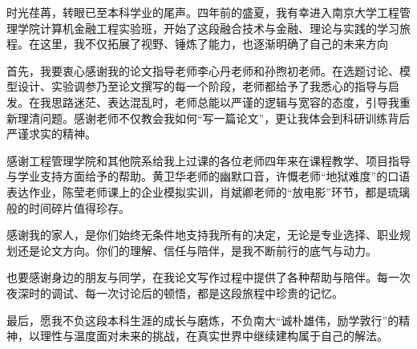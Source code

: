 \documentclass[
    type = bachelor, %
    decl-page,  %
    oneside,                %
  ]{njuthesis}
\begin{document}
%   
%   









\printbibliography


\begin{acknowledgement}
  
  
时光荏苒，转眼已至本科学业的尾声。四年前的盛夏，我有幸进入南京大学工程管理学院计算机金融工程实验班，开始了这段融合技术与金融、理论与实践的学习旅程。在这里，我不仅拓展了视野、锤炼了能力，也逐渐明确了自己的未来方向

首先，我要衷心感谢我的论文指导老师李心丹老师和孙煦初老师。在选题讨论、模型设计、实验调参乃至论文撰写的每一个阶段，老师都给予了我悉心的指导与启发。在我思路迷茫、表达混乱时，老师总能以严谨的逻辑与宽容的态度，引导我重新理清问题。感谢老师不仅教会我如何“写一篇论文”，更让我体会到科研训练背后严谨求实的精神。

感谢工程管理学院和其他院系给我上过课的各位老师四年来在课程教学、项目指导与学业支持方面给予的帮助。黄卫华老师的幽默口音，许慨老师“地狱难度”的口语表达作业，陈莹老师课上的企业模拟实训，肖斌卿老师的“放电影”环节，都是琉璃般的时间碎片值得珍存。

感谢我的家人，是你们始终无条件地支持我所有的决定，无论是专业选择、职业规划还是论文方向。你们的理解、信任与陪伴，是我不断前行的底气与动力。

也要感谢身边的朋友与同学，在我论文写作过程中提供了各种帮助与陪伴。每一次夜深时的调试、每一次讨论后的顿悟，都是这段旅程中珍贵的记忆。

最后，愿我不负这段本科生涯的成长与磨炼，不负南大“诚朴雄伟，励学敦行”的精神，以理性与温度面对未来的挑战，在真实世界中继续建构属于自己的解法。
  
\end{acknowledgement}




\appendix





\end{document}
